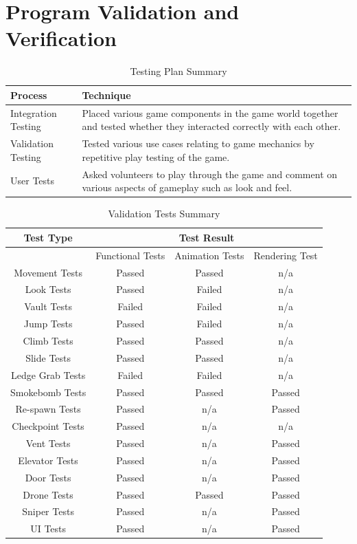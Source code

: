 \documentclass[11pt,a4paper]{article}
\begin{document}
\section{Program Validation and Verification}

\begin{table}[H]
\caption{Testing Plan Summary}
	\begin{center}
		\begin{tabular}{ |l|p{10cm}| } 
			\hline
			Process & Technique \\ \hline
			Integration Testing & Placed various game components in the game world together and tested whether they interacted correctly with each other. \\ \hline
			Validation Testing & Tested various use cases relating to game mechanics by repetitive play testing of the game. \\ \hline
			User Tests & Asked volunteers to play through the game and comment on various aspects of gameplay such as look and feel.\\
			\hline
		\end{tabular}
	\end{center}
\end{table}
\begin{table}[H]
	\caption{Validation Tests Summary}
	\begin{center}
		\begin{tabular}{ |c|c|c|c| } 
			\hline
			Test Type & \multicolumn{3}{|c|}{Test Result}\\ \hline
			& Functional Tests & Animation Tests & Rendering Test\\ \hline
			Movement Tests & Passed & Passed & n/a\\ \hline
			Look Tests & Passed & Failed & n/a\\ \hline
			Vault Tests & Failed & Failed & n/a\\ \hline
			Jump Tests & Passed & Failed & n/a\\ \hline
			Climb Tests & Passed & Passed & n/a\\ \hline
			Slide Tests & Passed & Passed & n/a\\ \hline
			Ledge Grab Tests & Failed & Failed & n/a\\ \hline
			Smokebomb Tests & Passed & Passed & Passed\\ \hline
			Re-spawn Tests & Passed & n/a & Passed\\ \hline
			Checkpoint Tests & Passed & n/a & n/a\\ \hline
			Vent Tests & Passed & n/a & Passed\\ \hline
			Elevator Tests & Passed & n/a & Passed\\ \hline
			Door Tests & Passed & n/a & Passed\\ \hline
			Drone Tests & Passed & Passed & Passed\\ \hline
			Sniper Tests & Passed & n/a & Passed\\ \hline
			UI Tests & Passed & n/a & Passed\\ \hline
		\end{tabular}
	\end{center}
\end{table}
\end{document}
